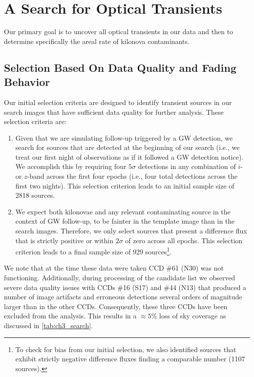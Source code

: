 \clearpage
\section{A Search for Optical Transients}
\label{sec:ch3_search}

Our primary goal is to uncover all optical transients in our data and then to determine specifically the areal rate of kilonova contaminants.

\subsection{Selection Based On Data Quality and Fading Behavior}
\label{sec:ch3_data_cuts}

Our initial selection criteria are designed to identify transient sources in our search images that have sufficient data quality for further analysis. These selection criteria are:

\begin{enumerate}
\item Given that we are simulating follow-up triggered by a GW detection, we search for sources that are detected at the beginning of our search (i.e., we treat our first night of observations as if it followed a GW detection notice). We accomplish this by requiring four $5\sigma$ detections in any combination of $i$- or $z$-band across the first four epochs (i.e., four total detections across the first two nights).  This selection criterion leads to an initial sample size of 2818 sources.

\item We expect both kilonovae and any relevant contaminating source in the context of GW follow-up, to be fainter in the template image than in the search images. Therefore, we only select sources that present a difference flux that is strictly positive or within $2\sigma$ of zero across all epochs. This selection criterion leads to a final sample size of 929 sources\footnote{To check for bias from our initial selection, we also identified sources that exhibit strictly negative difference fluxes finding a comparable number (1107 sources).}.
\end{enumerate}

\clearpage
We note that at the time these data were taken CCD \#61 (N30) was not functioning. Additionally, during processing of the candidate list we observed severe data quality issues with CCDs \#16 (S17) and \#44 (N13) that produced a number of image artifacts and erroneous detections several orders of magnitude larger than in the other CCDs. Consequently, these three CCDs have been excluded from the analysis. This results in a $\approx 5\%$ loss of sky coverage as discussed in \cref{tab:ch3_search}.

